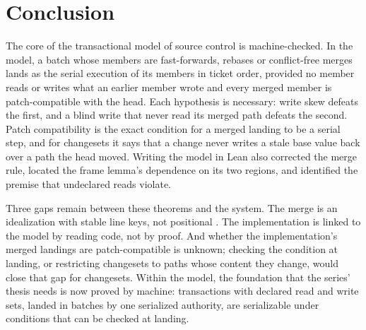 \documentclass[11pt,letterpaper]{article}
\theoremstyle{definition}
\theoremstyle{remark}
\begin{document}
\section{Conclusion}
\label{sec:mcbl:conclusion}

The core of the transactional model of source control is machine-checked. In the model, a batch whose members are fast-forwards, rebases or conflict-free merges lands as the serial execution of its members in ticket order, provided no member reads or writes what an earlier member wrote and every merged member is patch-compatible with the head. Each hypothesis is necessary: write skew defeats the first, and a blind write that never read its merged path defeats the second. Patch compatibility is the exact condition for a merged landing to be a serial step, and for changesets it says that a change never writes a stale base value back over a path the head moved. Writing the model in Lean also corrected the merge rule, located the frame lemma's dependence on its two regions, and identified the premise that undeclared reads violate.

Three gaps remain between these theorems and the system. The merge is an idealization with stable line keys, not positional . The implementation is linked to the model by reading code, not by proof. And whether the implementation's merged landings are patch-compatible is unknown; checking the condition at landing, or restricting changesets to paths whose content they change, would close that gap for changesets. Within the model, the foundation that the series' thesis needs is now proved by machine: transactions with declared read and write sets, landed in batches by one serialized authority, are serializable under conditions that can be checked at landing.
\end{document}

